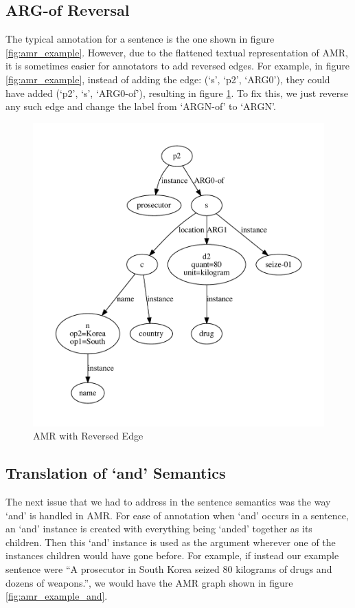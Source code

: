 \documentclass[12pt]{article}
\begin{document}
\subsection{ARG-of Reversal}
The typical annotation for a sentence is the one shown in figure \ref{fig:amr_example}. However, due to the flattened textual representation of AMR, it is sometimes easier for annotators to add reversed edges. For example, in figure \ref{fig:amr_example}, instead of adding the edge: (`s', `p2', `ARG0'), they could have added (`p2', `s', `ARG0-of'), resulting in figure \ref{fig:amr_example_argof}. To fix this, we just reverse any such edge and change the label from `ARGN-of' to `ARGN'.

\begin{figure}
\includegraphics[width=\linewidth]{amr_example_argof.pdf}
\caption{AMR with Reversed Edge}
\label{fig:amr_example_argof}
\end{figure}

\subsection{Translation of `and' Semantics}
The next issue that we had to address in the sentence semantics was the way `and' is handled in AMR. For ease of annotation when `and' occurs in a sentence, an `and' instance is created with everything being `anded' together as its children. Then this `and' instance is used as the argument wherever one of the instances children would have gone before. For example, if instead our example sentence were ``A prosecutor in South Korea seized 80 kilograms of drugs and dozens of weapons.'', we would have the AMR graph shown in figure \ref{fig:amr_example_and}.
\end{document}
